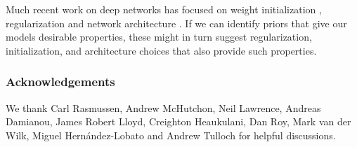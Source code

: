 \documentclass{article} %
\begin{document}
Much recent work on deep networks has focused on weight initialization \citep{martens2010deep}, regularization \citep{lee2007sparse} and network architecture \citep{gens2013learning}.
If we can identify priors that give our models desirable properties, these might in turn suggest regularization, initialization, and architecture choices that also provide such properties.



\subsubsection*{Acknowledgements}
We thank Carl Rasmussen, Andrew McHutchon, Neil Lawrence, Andreas Damianou, James Robert Lloyd, Creighton Heaukulani, Dan Roy, Mark van der Wilk, Miguel Hern\'{a}ndez-Lobato and Andrew Tulloch for helpful discussions.



\end{document}
